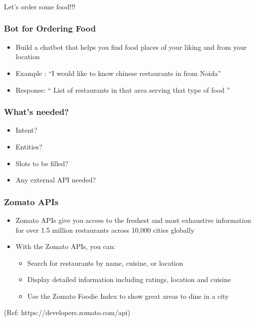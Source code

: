 \begin{frame}[fragile]\frametitle{}
\begin{center}
{\Large Let's order some food!!!}

\end{center}
\end{frame}



 \begin{frame}[fragile]\frametitle{Bot for Ordering Food}
\begin{itemize}
\item Build a chatbot that helps you find food places of your liking and from your location
\item Example : ``I would like to know chinese restaurants in from Noida''
\item Response: `` List of restaurants in that area serving that type of food ''
\end{itemize}
\end{frame}

 \begin{frame}[fragile]\frametitle{What's needed?}
\begin{itemize}
\item Intent?
\item Entities?
\item Slots to be filled?
\item Any external API needed?
\end{itemize}
\end{frame}

 \begin{frame}[fragile]\frametitle{Zomato APIs}
\begin{itemize}
\item Zomato APIs give you access to the freshest and most exhaustive information for over 1.5 million restaurants across 10,000 cities globally
\item With the Zomato APIs, you can:
\begin{itemize}
\item Search for restaurants by name, cuisine, or location
\item Display detailed information including ratings, location and cuisine
\item Use the Zomato Foodie Index to show great areas to dine in a city
\end{itemize}
\end{itemize}

{\tiny (Ref: https://developers.zomato.com/api)}
\end{frame}

